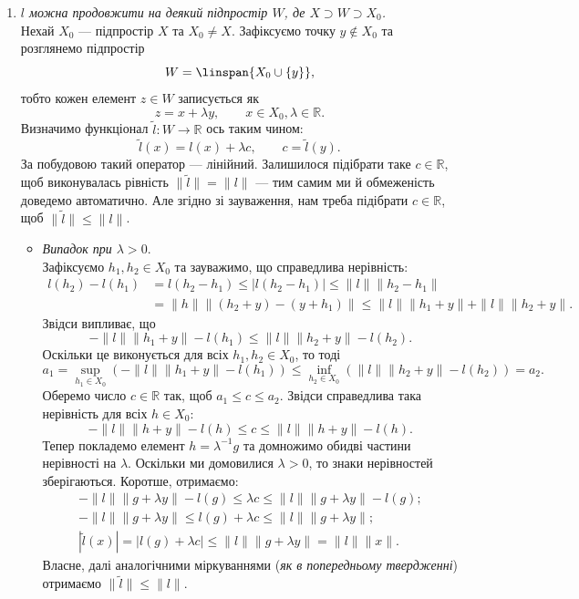 \documentclass{math_library}
\begin{document}
\begin{enumerate}[wide=0pt,label={\roman*.}]
\item \textit{$l$ можна продовжити на деякий підпростір $W$, де $X \supset W \supset X_0$.}\\
Нехай $X_0$ --- підпростір $X$ та $X_0 \neq X$. Зафіксуємо точку $y \notin X_0$ та розглянемо підпростір 
\[
W = \linspan\{X_0 \cup \{y\}\},
\]
тобто кожен елемент $z \in W$ записується як
\[
z = x + \lambda y, \qquad x \in X_0, \lambda \in \mathbb{R}.
\]
Визначимо функціонал $\tilde{l} \colon W \to \mathbb{R}$ ось таким чином: 
\[
\tilde{l}(x) = l(x) + \lambda c, \qquad c = \tilde{l}(y).
\]
За побудовою такий оператор --- лінійний. Залишилося підібрати таке $c \in \mathbb{R}$, щоб виконувалась рівність $\|\tilde{l}\| = \|l\|$ --- тим самим ми й обмеженість доведемо автоматично. Але згідно зі зауваження, нам треба підібрати $c \in \mathbb{R}$, щоб $\|\tilde{l}\| \leq \|l\|$.
\begin{itemize}[wide=0pt]
\item \textit{Випадок при $\lambda > 0$}.\\
Зафіксуємо $h_1,h_2 \in X_0$ та зауважимо, що справедлива нерівність:
\begin{align*}
l(h_2) - l(h_1) & = l(h_2-h_1) \leq |l(h_2-h_1)| \leq \|l\| \|h_2 - h_1\| \\
& = \|h \| \|(h_2+y) - (y+h_1)\| \leq \|l\| \|h_1+y\| + \|l\| \|h_2+y\|.
\end{align*}
Звідси випливає, що
\[
-\|l\| \|h_1+y\| - l(h_1) \leq \|l\| \|h_2+y\| - l(h_2).
\]
Оскільки це виконується для всіх $h_1,h_2 \in X_0$, то тоді
\[
a_1 = \sup_{h_1 \in X_0} (-\|l\| \|h_1+y\| - l(h_1)) \leq \inf_{h_2 \in X_0} ( \|l\| \|h_2+y\| - l(h_2)) = a_2.
\]
Оберемо число $c \in \mathbb{R}$ так, щоб $a_1 \leq c \leq a_2$. Звідси справедлива така нерівність для всіх $h \in X_0$:
\[
-\|l\| \|h+y\| - l(h) \leq c \leq \|l\| \|h+y\| - l(h).
\]
Тепер покладемо елемент $h = \lambda^{-1}g$ та домножимо обидві частини нерівності на $\lambda$. Оскільки ми домовилися $\lambda > 0$, то знаки нерівностей зберігаються. Коротше, отримаємо:
\begin{align*}
-\|l\| \|g+\lambda y \| - l(g) \leq \lambda c \leq \|l\| \|g + \lambda y \| - l(g); \\
-\|l\| \|g+\lambda y\| \leq l(g) + \lambda c \leq \|l\| \|g+\lambda y\|; \\
|\tilde{l}(x)| = |l(g) + \lambda c| \leq \|l\| \|g + \lambda y\| = \|l\| \|x\|.
\end{align*}
Власне, далі аналогічними міркуваннями (\textit{як в попередньому твердженні}) отримаємо $\|\tilde{l}\| \leq \|l\|$.


\end{itemize}
\end{enumerate}
\end{document}
